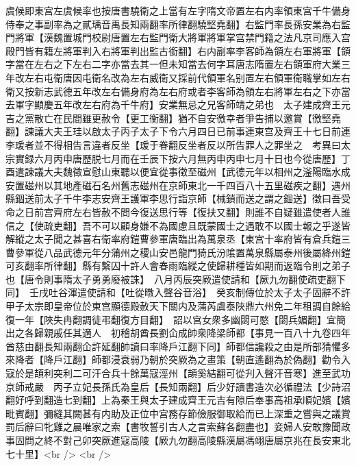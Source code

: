 虞候即東宫左虞候率也按唐書驍衛之上當有左字隋文帝置左右内率領東宫千牛備身侍奉之事副率為之貳瑀音禹長知兩翻率所律翻驍堅堯翻】右監門率長孫安業為右監門將軍【漢魏置城門校尉唐置左右監門衛大將軍將軍掌宫禁門籍之法凡京司應入宫殿門皆有籍左將軍判入右將軍判出監古銜翻】右内副率李客師為領左右軍將軍【領字當在左右之下左右二字亦當去其一但未知當去何字耳唐志隋置左右領軍府大業三年改左右屯衛唐因屯衛名改為左右威衛又採前代領軍名别置左右領軍衛職掌如左右衛又按新志武德五年改左右備身府為左右府或者李客師為領左右將軍左右之下亦當去軍字顯慶五年改左右府為千牛府】安業無忌之兄客師靖之弟也　太子建成齊王元吉之黨散亡在民間雖更赦令【更工衡翻】猶不自安徼幸者爭告捕以邀賞【徼堅堯翻】諫議大夫王珪以啟太子丙子太子下令六月四日已前事連東宫及齊王十七日前連李瑗者並不得相告言違者反坐【瑗于眷翻反坐者反以所告罪人之罪坐之　考異曰太宗實録六月丙申唐歷脱七月而在壬辰下按六月無丙申丙申七月十日也今從唐歷】丁酉遣諫議大夫魏徵宣慰山東聽以便宜從事徵至磁州【武德元年以相州之滏陽臨水成安置磁州以其地產磁石名州舊志磁州在京師東北一千四百八十五里磁疾之翻】遇州縣錮送前太子千牛李志安齊王護軍李思行詣京師【械鎖而送之謂之錮送】徵曰吾受命之日前宫齊府左右皆赦不問今復送思行等【復扶又翻】則誰不自疑雖遣使者人誰信之【使疏吏翻】吾不可以顧身嫌不為國慮且既蒙國士之遇敢不以國士報之乎遂皆解縱之太子聞之甚喜右衛率府鎧曹參軍唐臨出為萬泉丞【東宫十率府皆有倉兵鎧三曹參軍從八品武德元年分蒲州之稷山安邑龍門猗氏汾隂置萬泉縣屬泰州後屬絳州鎧可亥翻率所律翻】縣有繫囚十許人會春雨臨縱之使歸耕種皆如期而返臨令則之弟子也【唐令則事隋太子勇勇廢被誅】　八月丙辰突厥遣使請和【厥九勿翻使疏吏翻下同】　壬戌吐谷渾遣使請和【吐從暾入聲谷音浴】　癸亥制傳位於太子太子固辭不許甲子太宗即皇帝位於東宫顯德殿赦天下關内及蒲芮虞泰陜鼎六州免二年租調自餘給復一年【陜失冉翻調徒弔翻復方目翻】　詔以宫女衆多幽閟可愍【閟兵媚翻】宜簡出之各歸親戚任其適人　初稽胡酋長劉仚成帥衆降梁師都【事見一百八十九卷四年酋慈由翻長知兩翻仚許延翻帥讀曰率降戶江翻下同】師都信讒殺之由是所部猜懼多來降者【降戶江翻】師都浸衰弱乃朝於突厥為之畫策【朝直遙翻為於偽翻】勸令入寇於是頡利突利二可汗合兵十餘萬寇涇州【頡奚結翻可從刋入聲汗音寒】進至武功京師戒嚴　丙子立妃長孫氏為皇后【長知兩翻】后少好讀書造次必循禮法【少詩沼翻好呼到翻造七到翻】上為秦王與太子建成齊王元吉有隙后奉事高祖承順妃嬪【嬪毗賓翻】彌縫其闕甚有内助及正位中宫務存節儉服御取給而已上深重之嘗與之議賞罰后辭曰牝雞之晨唯家之索【書牧誓引古人之言索蘇各翻盡也】妾婦人安敢豫聞政事固問之終不對己卯突厥進寇高陵【厥九勿翻高陵縣漢屬馮翊唐屬京兆在長安東北七十里】<br />
<br />
